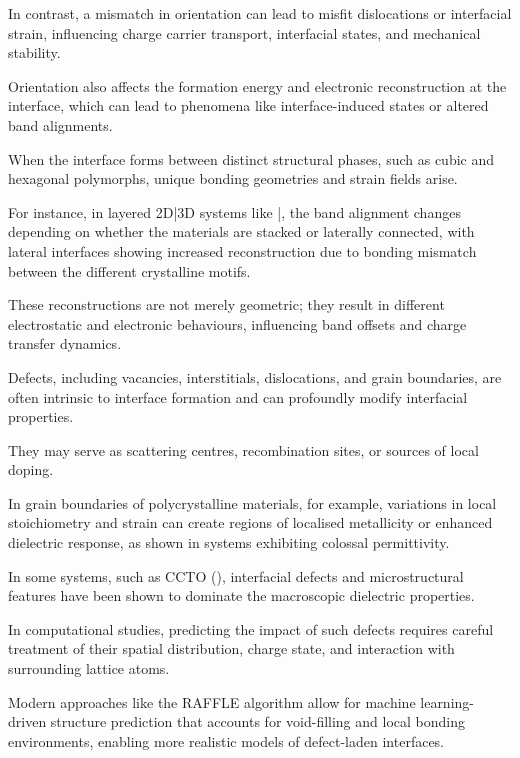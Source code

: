 In contrast, a mismatch in orientation can lead to misfit dislocations or interfacial strain, influencing charge carrier
transport, interfacial states, and mechanical stability.

Orientation also affects the formation energy and electronic reconstruction at the interface, which can lead to
phenomena like interface-induced states or altered band alignments.

\label{para:polymorph_interface_reconstruction} %

When the interface forms between distinct structural phases, such as cubic and hexagonal polymorphs, unique bonding
geometries and strain fields arise.

For instance, in layered 2D|3D systems like |, the band alignment changes depending on whether the
materials are stacked or laterally connected, with lateral interfaces showing increased reconstruction due to bonding
mismatch between the different crystalline motifs.

These reconstructions are not merely geometric; they result in different electrostatic and electronic behaviours,
influencing band offsets and charge transfer dynamics.

\label{para:interfacial_defects} %

Defects, including vacancies, interstitials, dislocations, and grain boundaries, are often intrinsic to interface
formation and can profoundly modify interfacial properties.

They may serve as scattering centres, recombination sites, or sources of local doping.

In grain boundaries of polycrystalline materials, for example, variations in local stoichiometry and strain can create
regions of localised metallicity or enhanced dielectric response, as shown in systems exhibiting colossal permittivity.

In some systems, such as CCTO (), interfacial defects and microstructural features have been shown to
dominate the macroscopic dielectric properties.

\label{para:defect_ml_prediction} %

In computational studies, predicting the impact of such defects requires careful treatment of their spatial distribution,
charge state, and interaction with surrounding lattice atoms.

Modern approaches like the RAFFLE algorithm allow for machine learning-driven structure prediction that accounts for
void-filling and local bonding environments, enabling more realistic models of defect-laden interfaces.

